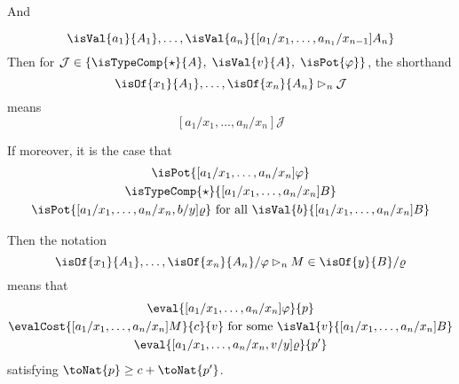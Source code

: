 And 

\[
\isVal{a_1}{A_1},\dots,\isVal{a_n}{[a_1/x_1,\dots,a_{n_1}/x_{n-1}]A_n}
\]
Then for $\mathcal{J} \in \{\isTypeComp{\star}{A},\; \isVal{v}{A},\; \isPot{\varphi}\}$, the shorthand
\[\isOf{x_1}{A_1},\dots,\isOf{x_n}{A_n} \rhd_n \mathcal{J}
\]
means
\[[a_1/x_1,\dots,a_n/x_n]\mathcal{J}\]

If moreover, it is the case that 
\begin{gather*}
    \isPot{[a_1/x_1,\dots,a_n/x_n]\varphi}\\
    \isTypeComp{\star}{[a_1/x_1,\dots,a_n/x_n]B}\\
    \isPot{[a_1/x_1,\dots,a_n/x_n,b/y]\varrho} \text{ for all } \isVal{b}{[a_1/x_1,\dots,a_n/x_n]B}\\
\end{gather*}

Then the notation
\[
\isOf{x_1}{A_1},\dots,\isOf{x_n}{A_n} / \varphi \rhd_n M \in \isOf{y}{B}/\varrho
\]
means that 
\begin{gather*}
\eval{[a_1/x_1,\dots,a_n/x_n]\varphi}{p}\\ 
\evalCost{[a_1/x_1,\dots,a_n/x_n]M}{c}{v} \text{ for some } \isVal{v}{[a_1/x_1,\dots,a_n/x_n]B}\\
\eval{[a_1/x_1,\dots,a_n/x_n,v/y]\varrho}{p'}
\end{gather*}
satisfying $\toNat{p} \ge c + \toNat{p'}$.


